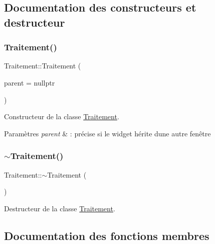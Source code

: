 \subsection{Documentation des constructeurs et destructeur}
\mbox{\label{classTraitement_a36edd9e6ce6e72cfef7f9c857c3c9cf2}} 
\subsubsection{\texorpdfstring{Traitement()}{Traitement()}}
{\footnotesize\ttfamily Traitement\+::\+Traitement (\begin{DoxyParamCaption}\item[{Q\+Object $\ast$}]{parent = {\ttfamily nullptr} }\end{DoxyParamCaption})\hspace{0.3cm}{\ttfamily [explicit]}}



Constructeur de la classe \hyperlink{classTraitement}{Traitement}. 


\begin{DoxyParams}{Paramètres}
{\em parent} & \+: précise si le widget hérite d\textquotesingle{}une autre fenêtre \\
\hline
\end{DoxyParams}
\mbox{\label{classTraitement_a7dd82f97c992d07b7032184f12c7fab9}} 
\subsubsection{\texorpdfstring{$\sim$\+Traitement()}{~Traitement()}}
{\footnotesize\ttfamily Traitement\+::$\sim$\+Traitement (\begin{DoxyParamCaption}{ }\end{DoxyParamCaption})}



Destructeur de la classe \hyperlink{classTraitement}{Traitement}. 



\subsection{Documentation des fonctions membres}
\mbox{\label{classTraitement_a81d1717924fb7a206df394afae4e19dc}} 
